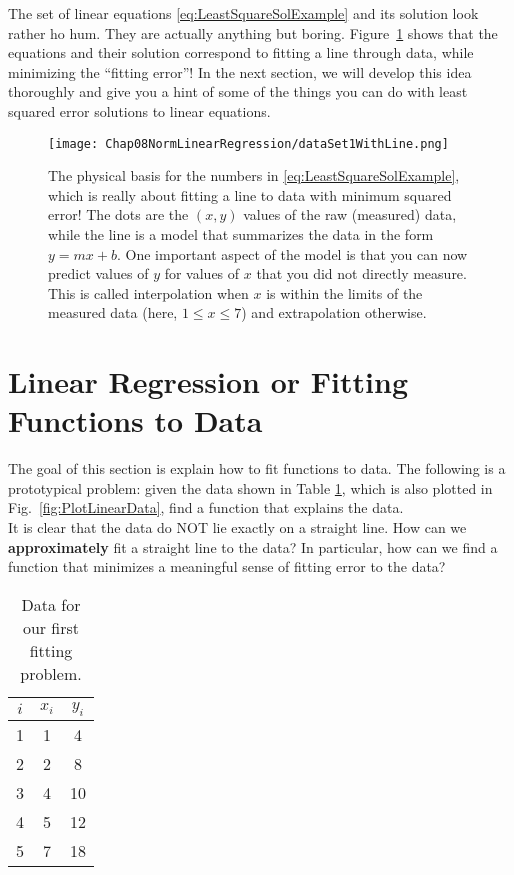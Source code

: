 The set of linear equations \eqref{eq:LeastSquareSolExample} and its solution look rather ho hum. They are actually anything but boring. Figure~\ref{fig:MotivatingLeastSqaures} shows that the equations and their solution correspond to fitting a line through data, while minimizing the ``fitting error''! In the next section, we will develop this idea thoroughly and give you a hint of some of the things you can do with least squared error solutions to linear equations. 
\begin{figure}[!hbt]
        \centerline{\texttt{[image: Chap08NormLinearRegression/dataSet1WithLine.png]}}
        \caption{The physical basis for the numbers in \eqref{eq:LeastSquareSolExample}, which is really about fitting a line to data with minimum squared error! The dots are the $(x,y)$ values of the raw (measured) data, while the line is a model that summarizes the data in the form $y=m x + b$. One important aspect of the model is that you can now predict values of $y$ for values of $x$ that you did not directly measure. This is called interpolation when $x$ is within the limits of the measured data (here, $1 \le x \le 7$) and extrapolation otherwise. }
        \label{fig:MotivatingLeastSqaures}
\end{figure}

\section{Linear Regression or Fitting Functions to Data}
\label{sec:LinearRegression}



The goal of this section is explain how to fit functions to data. The following is a prototypical problem: given the data shown in Table \ref{tab:LinearData}, which is also plotted in Fig.~\ref{fig:PlotLinearData}, find a function that explains the data.\\

It is clear that the data do NOT lie exactly on a straight line. How can we {\bf approximately} fit a straight line to the data? In particular, how can we find a function that minimizes a meaningful sense of fitting error to the data?

\begin{table}[!hbt]
\caption[]{Data for our first fitting problem.}
\label{tab:LinearData}
\begin{center}
\begin{tabular}{||c|c|c||}
\hline
$ i$ & $x_i$ & $y_i$\\
\hline
1 &1  &   4 \\
 2& 2    &  8 \\
3& 4   & 10 \\
4& 5  &  12 \\
5 & 7   & 18 \\
\hline
\end{tabular}
\end{center}
\end{table}


